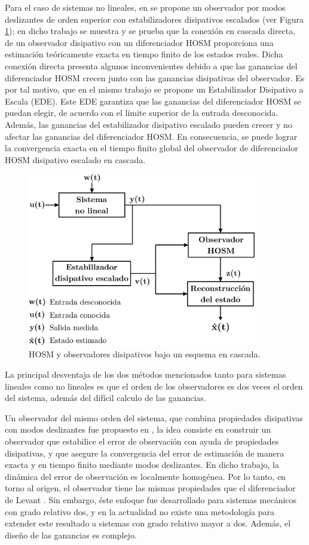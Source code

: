 \documentclass[11pt,letterpaper,twoside,openright]{report}
\begin{document}
	Para el caso de sistemas no lineales, en \cite{Apaza2018Higher}  se propone un observador por modos deslizantes de orden superior con estabilizadores disipativos escalados (ver Figura \ref{Fig: Capitulo1 - Observador en cascada NLTI}); en dicho trabajo se muestra y  se prueba que la conexión en cascada directa, de un observador disipativo con un diferenciador HOSM proporciona una estimación teóricamente exacta en tiempo finito de los estados reales. Dicha conexión directa presenta algunos inconvenientes debido a que las ganancias del diferenciador HOSM crecen junto con las ganancias disipativas del observador. Es por tal motivo, que en el mismo trabajo se propone un Estabilizador Disipativo a Escala (EDE). Este EDE garantiza que las ganancias del diferenciador HOSM se puedan elegir, de acuerdo con el límite superior de la entrada desconocida. Además, las ganancias del estabilizador disipativo escalado pueden crecer y no afectar las ganancias del diferenciador HOSM. En consecuencia, se puede lograr la convergencia exacta en el tiempo finito global del observador de diferenciador HOSM disipativo escalado en cascada.
	\begin{figure}[hbtp]
	\centering
	\includegraphics[width=10cm]{Capitulo1_CascadaNLTI.eps}
	\caption{HOSM y observadores disipativos bajo un esquema en cascada.}
	\label{Fig: Capitulo1 - Observador en cascada NLTI}
	\end{figure}
 	 La principal desventaja de los dos métodos mencionados tanto para sistemas lineales como no lineales es que el orden de los observadores es dos veces el orden del sistema, además del difícil calculo de las ganancias.
	
	Un observador del mismo orden del sistema, que combina propiedades disipativas con modos deslizantes fue propuesto en \cite{Apaza2018Dissipative}, la idea consiste en construir un observador que estabilice el error de observación con ayuda de propiedades disipativas, y que asegure la convergencia del error de estimación de manera exacta y en tiempo finito mediante modos deslizantes. En dicho trabajo, la dinámica del error de observación es localmente homogénea. Por lo tanto, en torno al origen, el observador tiene las  mismas propiedades que el diferenciador de Levant \cite{Levant1998}. Sin embargo, éste enfoque fue desarrollado para sistemas mecánicos con grado relativo dos, y en la actualidad no existe una metodología para extender este resultado a sistemas con grado relativo mayor a dos. Además, el diseño de las ganancias es complejo.
	
\end{document}
